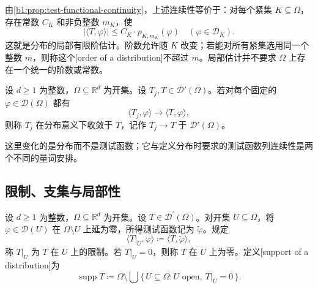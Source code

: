 \ProseParagraphBreak

由\cref{b1:prop:test-functional-continuity}，上述连续性等价于：对每个紧集 \(K\subseteq\Omega\)，存在常数 \(C_K\) 和非负整数 \(m_K\)，使
\begin{equation}\label{b1:eq:distribution-local-order}
 |\langle T,\varphi\rangle|
 \leq C_K\cdot p_{K,m_K}(\varphi)
 \quad(\varphi\in\mathcal D_K).
\end{equation}
这就是分布的局部有限阶估计。阶数允许随 \(K\) 改变；若能对所有紧集选用同一个整数 \(m\)，则称这个[order of a distribution]不超过 \(m\)。局部估计并不要求 \(\Omega\) 上存在一个统一的阶数或常数。

\begin{definition}\label{b1:def:distribution-convergence}
设 \(d\geq1\) 为整数，\(\Omega\subseteq\mathbb R^d\) 为开集。设 \(T_j,T\in\mathcal D'(\Omega)\)。若对每个固定的 \(\varphi\in\mathcal D(\Omega)\) 都有
\[
 \langle T_j,\varphi\rangle\longrightarrow\langle T,\varphi\rangle,
\]
则称 \(T_j\) 在分布意义下收敛于 \(T\)，记作 \(T_j\rightarrow T\) 于 \(\mathcal D'(\Omega)\)。
\end{definition}

这里变化的是分布而不是测试函数；它与定义分布时要求的测试函数列连续性是两个不同的量词安排。

\subsection{限制、支集与局部性}
\label{b1:subsec:2002-restriction-support}

\begin{definition}\label{b1:def:distribution-support}
设 \(d\geq1\) 为整数，\(\Omega\subseteq\mathbb R^d\) 为开集。设 \(T\in\mathcal D^{\prime}(\Omega)\)。对开集 \(U\subseteq\Omega\)，将 \(\varphi\in\mathcal D(U)\) 在 \(\Omega\setminus U\) 上延为零，所得测试函数记为 \(\widetilde\varphi\)。规定
\[
 \langle T|_U,\varphi\rangle\coloneqq\langle T,\widetilde\varphi\rangle,
\]
称 \(T|_U\) 为 \(T\) 在 \(U\) 上的限制。若 \(T|_U=0\)，则称 \(T\) 在 \(U\) 上为零。定义[support of a distribution]为
\[
 \operatorname{supp}T
 \coloneqq\Omega\setminus\bigcup\{\,U\subseteq\Omega:U\text{ open},\ T|_U=0\,\}.
\]
\end{definition}


